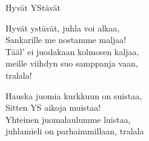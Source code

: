 \begin{song}{Hyvät YStävät}

    Hyvät ystävät, juhla voi alkaa,\\
    Sankarille me nostamme maljaa!\\
    \repetitionbegin{} Tääl’ ei juodakaan kolmosen kaljaa,\\
    meille viihdyn suo samppanja vaan,\\
    tralala! \repetitionend{}

    Hauska juomia kurkkuun on suistaa,\\
    Sitten YS aikoja muistaa!\\
    \repetitionbegin{} Yhteinen juomalaulumme luistaa,\\
    juhlamieli on parhaimmillaan, tralala \repetitionend{}

\end{song}
